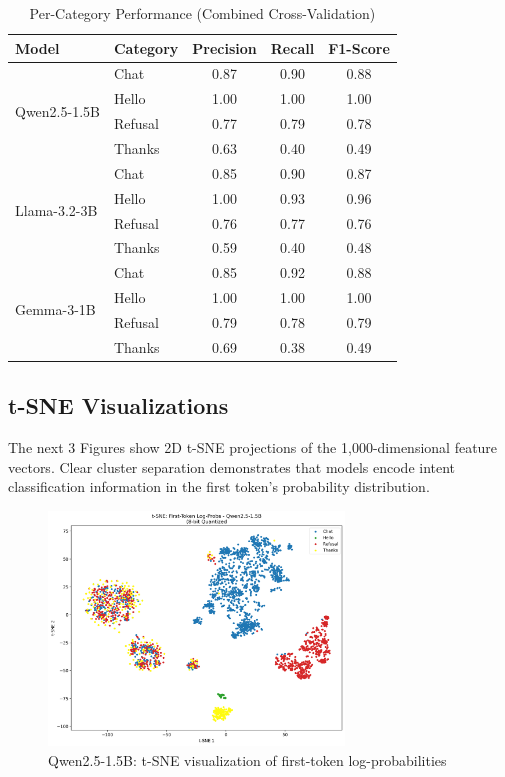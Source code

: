 \documentclass[11pt]{article}
\begin{document}
\begin{table}[H]
\centering
\caption{Per-Category Performance (Combined Cross-Validation)}
\label{tab:category}
\begin{tabular}{@{}llccc@{}}
\toprule
\textbf{Model} & \textbf{Category} & \textbf{Precision} & \textbf{Recall} & \textbf{F1-Score} \\
\midrule
\multirow{4}{*}{Qwen2.5-1.5B} & Chat & 0.87 & 0.90 & 0.88 \\
 & Hello & 1.00 & 1.00 & 1.00 \\
 & Refusal & 0.77 & 0.79 & 0.78 \\
 & Thanks & 0.63 & 0.40 & 0.49 \\
\midrule
\multirow{4}{*}{Llama-3.2-3B} & Chat & 0.85 & 0.90 & 0.87 \\
 & Hello & 1.00 & 0.93 & 0.96 \\
 & Refusal & 0.76 & 0.77 & 0.76 \\
 & Thanks & 0.59 & 0.40 & 0.48 \\
\midrule
\multirow{4}{*}{Gemma-3-1B} & Chat & 0.85 & 0.92 & 0.88 \\
 & Hello & 1.00 & 1.00 & 1.00 \\
 & Refusal & 0.79 & 0.78 & 0.79 \\
 & Thanks & 0.69 & 0.38 & 0.49 \\
\bottomrule
\end{tabular}
\end{table}

\subsection{t-SNE Visualizations}

The next 3 Figures show 2D t-SNE projections of the 1,000-dimensional feature vectors. Clear cluster separation demonstrates that models encode intent classification information in the first token's probability distribution.

\begin{figure}[H]
\centering
\includegraphics[width=0.7\textwidth]{tsne_Qwen2_5_1_5B_8bit.png}
\caption{Qwen2.5-1.5B: t-SNE visualization of first-token log-probabilities}
\label{fig:qwen}
\end{figure}
\end{document}
